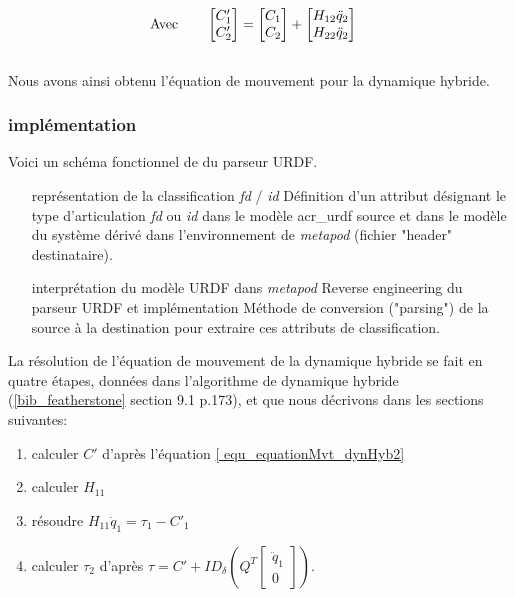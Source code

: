 \documentclass{report}
\begin{document}
\begin{align}
&\textnormal{Avec} \qquad
\begin{bmatrix}
  C'_{1} \\
  C'_{2}
\end{bmatrix}
=
\begin{bmatrix}
  C_{1} \\
  C_{2}
\end{bmatrix}
+
\begin{bmatrix}
  H_{12} \ddot{q}_2 \\
  H_{22} \ddot{q}_2
\end{bmatrix} \label{equ_cPrime}
\end{align}
\\
Nous avons ainsi obtenu l'équation de mouvement pour la dynamique hybride.

\subsubsection{implémentation}

Voici un schéma fonctionnel de du parseur URDF.


\begin{itemize}
  \item[représentation de la classification \emph{fd} / \emph{id}] Définition d'un attribut désignant le type d'articulation \emph{fd} ou \emph{id} dans le modèle \gls{acr_urdf} source et dans le modèle du système dérivé dans l'environnement de \emph{metapod} (fichier "header" destinataire).
  \item[interprétation du modèle URDF dans \emph{metapod}] Reverse engineering du parseur URDF et implémentation Méthode de conversion ("parsing") de la source à la destination pour extraire ces attributs de classification.
\end{itemize}
\bigskip
La résolution de l'équation de mouvement de la dynamique hybride se fait en quatre étapes, données dans l'algorithme de dynamique hybride (\ref{bib_featherstone} section 9.1 p.173), et que nous décrivons dans les sections suivantes:
\begin{enumerate}
\item calculer $C'$ d'après l'équation \eqref{   equ_equationMvt_dynHyb2}
\item calculer $H_{11}$
\item résoudre $H_{11} \ddot{q}_1 = \tau_1 - C'_1$
\item calculer $\tau_2$ d'après $\tau = C' + ID_{\delta} \left( Q^T \begin{bmatrix} 
                                                                      \ddot{q}_1 \\
                                                                      0 
                                                                    \end{bmatrix} \right)$.
\end{enumerate}
\end{document}
